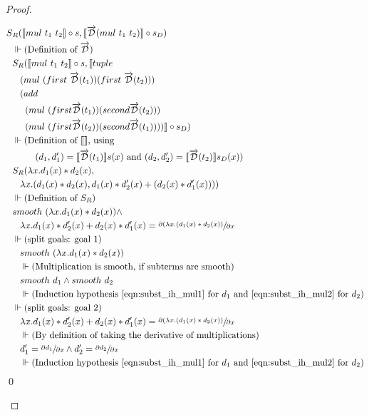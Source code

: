 \documentclass[11pt, final]{article}
\begin{document}
\begin{proof}
\begin{enumerate}
      \begin{align*}
        S&_R(\llbracket mul\ t_1\ t_2 \rrbracket \circ s, \llbracket \overrightarrow{\mathcal{D}}(mul\ t_1\ t_2) \rrbracket \circ s_D) \\
        &\Vdash \text{(Definition of $\overrightarrow{\mathcal{D}}$)}\\
        &S_R(\llbracket mul\ t_1\ t_2 \rrbracket \circ s, \llbracket tuple\ \\
        & \;\;\;(mul\ (first\ \overrightarrow{\mathcal{D}}(t_1)) (first\ \overrightarrow{\mathcal{D}}(t_2)))\ \\
        & \;\;\;(add\ \\
        & \;\;\;\;\;(mul\ (first \overrightarrow{\mathcal{D}}(t_1)) (second \overrightarrow{\mathcal{D}}(t_2))) \\
        & \;\;\;\;\;(mul\ (first \overrightarrow{\mathcal{D}}(t_2)) (second \overrightarrow{\mathcal{D}}(t_1)))) \rrbracket \circ s_D) \\
        &\Vdash \text{(Definition of $\llbracket\rrbracket$, using} \\
        & \;\;\;\;\;\;\;\;\; \text{$(d_1, d_1') = \llbracket \overrightarrow{\mathcal{D}}(t_1) \rrbracket s(x)$ and $(d_2, d_2') = \llbracket \overrightarrow{\mathcal{D}}(t_2) \rrbracket s_D(x)$)}\\
        &S_R(\lambda x. d_1(x) * d_2(x), \\
        & \;\;\; \lambda x. (d_1(x) * d_2(x), d_1(x) * d_2'(x) + (d_2(x) * d_1'(x)))) \\
        &\Vdash \text{(Definition of $S_R$)}\\
        &smooth\ (\lambda x. d_1(x) * d_2(x)) \wedge \\
        & \;\;\; \lambda x. d_1(x) * d_2'(x) + d_2(x) * d_1'(x) = \sfrac{\partial{(\lambda x. (d_1(x) * d_2(x))}}{\partial{x}} \\
        &\Vdash \text{(split goals: goal 1)}\\
        &\;\;\;smooth\ (\lambda x. d_1(x) * d_2(x)) \\
        &\;\;\;\Vdash
          \text{(Multiplication is smooth, if subterms are smooth)}\\
        &\;\;\;smooth\ d_1 \wedge smooth\ d_2 \\
        &\;\;\;\Vdash \text{(Induction hypothesis \ref{eqn:subst_ih_mul1} for $d_1$ and \ref{eqn:subst_ih_mul2} for $d_2$)}\\
        &\Vdash \text{(split goals: goal 2)}\\
        &\;\;\;\lambda x. d_1(x) * d_2'(x) + d_2(x) * d_1'(x) = \sfrac{\partial{(\lambda x. (d_1(x) * d_2(x))}}{\partial{x}} \\
        &\;\;\;\Vdash \text{(By definition of taking the derivative of multiplications)} \\
        &\;\;\; d_1' = \sfrac{\partial{d_1}}{\partial{x}} \wedge d_2' = \sfrac{\partial{d_2}}{\partial{x}} \\
        &\;\;\;\Vdash \text{(Induction hypothesis \ref{eqn:subst_ih_mul1} for $d_1$ and \ref{eqn:subst_ih_mul2} for $d_2$)}\\
      \end{align*} \qed


\end{enumerate}
\end{proof}
\end{document}
